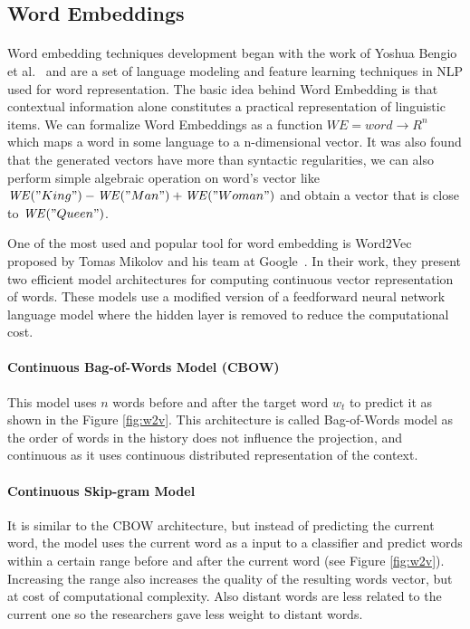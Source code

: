 \subsection{Word Embeddings}
\paragraph{}
Word embedding techniques development began with the work of Yoshua Bengio et al.~\cite{bengio2003neural} and are a set of language modeling and feature learning techniques in NLP used for word representation. The basic idea behind Word Embedding is that  contextual information alone constitutes a practical representation of linguistic items. We can formalize Word Embeddings as a function \(\mathit{WE} = word \rightarrow R^n\) which maps a word in some language to a n-dimensional vector. 
It was also found that the generated vectors have more than syntactic regularities, we can also perform simple algebraic operation on word's vector like \(\mathit{WE} ("King")-\mathit{WE}("Man")+\mathit{WE} ("Woman")\) and obtain a vector that is close to \(\mathit{WE}("Queen")\).

One of the most used and popular tool for word embedding is Word2Vec proposed by Tomas Mikolov and his team at Google~\cite{mikolov2013efficient}. In their work, they present two efficient model architectures for computing continuous vector representation of words. These models use a modified version of a feedforward neural network language model where the hidden layer is removed to reduce the computational cost.

\pagebreak

\paragraph{Continuous Bag-of-Words Model (CBOW)}
This model uses \(n\) words before and after the target word \(w_t\) to predict it as shown in the Figure \ref{fig:w2v}. This architecture is called Bag-of-Words model as the order of words in the history does not influence the projection, and continuous as it uses continuous distributed representation of the context.


\paragraph{Continuous Skip-gram Model}
It is similar to the CBOW architecture, but instead of predicting the current word, the model uses the current word as a input to a classifier and predict words within a certain range before and after the current word (see Figure \ref{fig:w2v}). Increasing the range also increases the quality of the resulting words vector, but at cost of computational complexity. Also distant words are less related to the current one so the researchers gave less weight to distant words.


